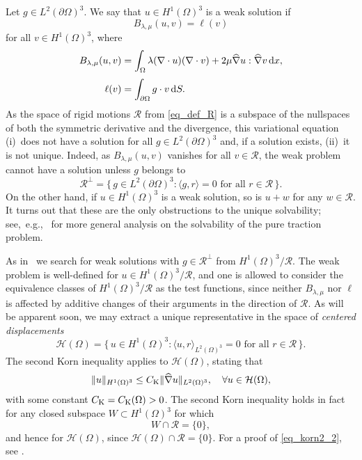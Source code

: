\documentclass[reqno]{amsart}
\numberwithin{equation}{section}
\numberwithin{figure}{section}
\numberwithin{table}{section}
\newcommand{\norm}[1]{\lVert#1\rVert}
\newcommand{\inner}[1]{\langle#1\rangle}
\newcommand{\di}{\mathrm{d}}
\theoremstyle{definition}
\theoremstyle{plain}
\theoremstyle{definition}
\theoremstyle{remark}
\numberwithin{equation}{section}
\begin{document}
Let $g \in L^2(\partial\Omega)^3$. We say that $u \in H^1(\Omega)^3$ is a weak solution if
%
\begin{equation} \label{eq_weak}
	B_{\lambda, \mu}(u,v) = \ell(v) 
\end{equation}
%
for all $v \in H^1(\Omega)^3$, where
%
\begin{align*}
	B_{\lambda, \mu}(u,v) &= \int_\Omega \lambda (\nabla \cdot u)(\nabla \cdot v) + 2 \mu \widehat{\nabla} u :\widehat{\nabla} v  \,\di x, \\[1mm]
	\ell(v) &= \int_{ \partial\Omega} g \cdot v \,{\rm d}S.
\end{align*}
%
As the space of rigid motions $\mathcal{R}$ from \eqref{eq_def_R} is a subspace of the nullspaces of both the symmetric derivative and the divergence,   this variational equation (i)~does not have a solution for all $g \in L^2(\partial\Omega)^3$ and, if a solution exists, (ii)~it is not unique. Indeed, as $B_{\lambda,\mu}(u,v)$ vanishes for all $v \in \mathcal{R}$, the weak problem cannot have a solution unless $g$ belongs to
%
\begin{equation*}
	\mathcal{R}^{\perp} = \{\, g\in L^2(\partial\Omega)^3 : \inner{g,r} = 0  \text{ for all } r\in \mathcal{R} \,\}.
\end{equation*}
%
On the other hand, if $u \in H^1(\Omega)^3$ is a weak solution, so is $u + w$ for any $w \in \mathcal{R}$. It turns out that these are the only obstructions to the unique solvability; see,~e.g.,~\cite{Ciarlet78,OSY92} for more general analysis on the solvability of the pure traction problem.

As in~\cite{Kaleem26} we search for weak solutions with $g \in \mathcal{R}^{\perp}$ from $H^1(\Omega)^3 / \mathcal R$. The weak problem is well-defined for $u \in H^1(\Omega)^3 / \mathcal R$, and one is allowed to consider the equivalence classes of $H^1(\Omega)^3 / \mathcal R$ as the test functions, since neither $B_{\lambda,\mu}$ nor $\ell$ is affected by additive changes of their arguments in the direction of $\mathcal{R}$. As will be apparent soon, we may extract a unique representative in the space of \emph{centered displacements}
%
\begin{equation} \label{eq_def_H}
	\mathcal{H}(\Omega) = \{\, u \in H^1(\Omega)^3  : \inner{u,r}_{L^2(\Omega)^3} = 0 \text{ for all } r\in \mathcal{R} \,\}.
\end{equation}
%
The second Korn inequality applies to $\mathcal H(\Omega)$, stating that
%
\begin{align}  \label{eq_korn2_2}
	\norm{u}_{H^1(\Omega)^3} \leq C_{\rm K} \norm{\widehat{\nabla}u}_{L^2(\Omega)^3}, \quad \forall u \in \mathcal{H}(\Omega),
\end{align}
%
with some constant $C_{\rm K} = C_{\rm K}(\Omega) > 0$. The second Korn inequality holds in fact for any  closed subspace $W \subset H^1(\Omega)^3$ for which  
%
\begin{equation*}
	W\cap\mathcal{R} = \{0\},
\end{equation*}
%
and hence for $\mathcal H(\Omega)$, since $\mathcal H(\Omega) \cap \mathcal R = \{ 0 \}$. For a proof of \eqref{eq_korn2_2}, see \cite[theorem 2.5]{OSY92}.
\end{document}
